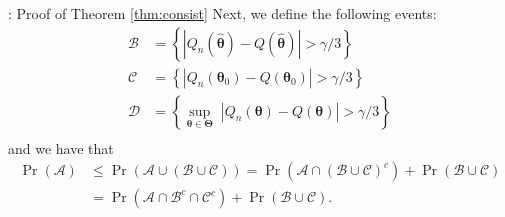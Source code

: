 \documentclass[envcountsect,usenames,dvipsnames]{beamer}
\theoremstyle{mystyle}
\begin{document}
\begin{frame}{\thesubsection: Proof of Theorem \ref{thm:consist}}
	\small
	Next, we define the following events:
			\begin{equation*}
				\begin{aligned}
					\mathcal{B} &= \left\{ 
					\left| Q_n(\hat{\bm{\theta}}) - Q(\hat{\bm{\theta}}) \right| > \gamma/3\right\}\\
					\mathcal{C} &= \left\{ \left|Q_n({\bm{\theta}_0}) - Q({\bm{\theta}_0})\right| > \gamma/3 \right\}\\
					\mathcal{D} &= \left\{ \sup_{\bm{\theta} \in \bm{\Theta}} \; \left|Q_n({\bm{\theta}}) - Q({\bm{\theta}})\right| > \gamma/3 \right\}\\
				\end{aligned}
			\end{equation*}
	and we have that
	\begin{equation*}
		\begin{aligned}
			\Pr \left(\mathcal{A}\right) &\leq \Pr \left(\mathcal{A} \cup \left(\mathcal{B} \cup \mathcal{C} \right)\right) = \Pr \left(\mathcal{A} \cap \left(\mathcal{B} \cup \mathcal{C} \right)^c\right) + \Pr \left(\mathcal{B} \cup \mathcal{C} \right)\\
			 &= \Pr \left(\mathcal{A} \cap \mathcal{B}^c \cap \mathcal{C}^c\right) + \Pr \left(\mathcal{B} \cup \mathcal{C} \right).
		\end{aligned}
	\end{equation*}
\end{frame}
\end{document}
